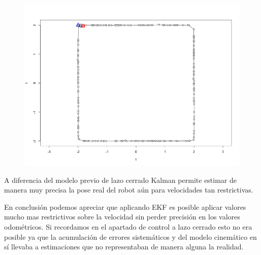 \begin{figure}[!htb]
\begin{center}
\includegraphics[width=\linewidth/2]{imagenesTrayectorias/ekf/ekf4.png}
\end{center}
\end{figure}
\FloatBarrier




A diferencia del modelo previo de lazo cerrado Kalman permite estimar de manera muy precisa la pose real del robot aún para velocidades tan restrictivas.

En conclusión podemos apreciar que aplicando EKF es posible aplicar valores mucho mas restrictivos sobre la velocidad sin perder precisión en los valores odométricos. Si recordamos en el apartado de control a lazo cerrado esto no era posible ya que la acumulación de errores sistemáticos y del modelo cinemático en sí llevaba a estimaciones que no representaban de manera alguna la realidad.


